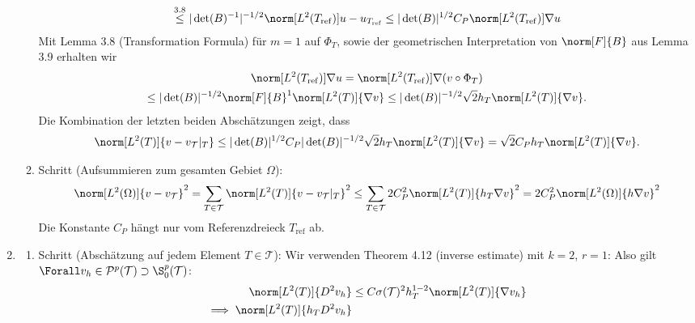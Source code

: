 \begin{solution}
\begin{enumerate}[label = \textbf{\alph*)}]
\begin{enumerate}[label = \arabic*.]
\begin{multline*}
      \stackrel
      {
        \mathrm{3.8}
      }{\leq}
      |\det(B)^{-1}|^{-1/2}
      \norm[L^2(T_\mathrm{ref})]{u - u_{T_\mathrm{ref}}}
      \leq
      |\det(B)|^{1/2}
      C_P
      \norm[L^2(T_\mathrm{ref})]{\nabla u}
    \end{multline*}
    Mit Lemma 3.8 (Transformation Formula) für $m = 1$ auf $\Phi_T$, sowie der
    geometrischen Interpretation von $\norm[F]{B}$ aus Lemma 3.9 erhalten wir
    \begin{multline*}
      \norm[L^2(T_\mathrm{ref})]{\nabla u}
      =
      \norm[L^2(T_\mathrm{ref})]{\nabla(v \circ \Phi_T)} \\
      \leq
      |\det(B)|^{-1/2}
      \norm[F]{B}^1
      \norm[L^2(T)]{\nabla v}
      \leq
      |\det(B)|^{-1/2}
      \sqrt{2}
      h_T
      \norm[L^2(T)]{\nabla v}.
    \end{multline*}
    Die Kombination der letzten beiden Abschätzungen zeigt, dass
    \begin{align*}
      \norm[L^2(T)]{v - v_\mathcal{T}|_T}
      \leq
      |\det(B)|^{1/2} C_P |\det(B)|^{-1/2} \sqrt{2} h_T \norm[L^2(T)]{\nabla v}
      =
      \sqrt{2} C_P h_T \norm[L^2(T)]{\nabla v}.
    \end{align*}
    \item Schritt (Aufsummieren zum gesamten Gebiet $\Omega$):
    \begin{align*}
      \norm[L^2(\Omega)]{v - v_\mathcal{T}}^2
      =
      \sum_{T \in \mathcal{T}}
      \norm[L^2(T)]{v - v_\mathcal{T}|_T}^2
      \leq
      \sum_{T \in \mathcal{T}}
      2 C_P^2 \norm[L^2(T)]{h_T \nabla v}^2
      =
      2 C_P^2 \norm[L^2(\Omega)]{h \nabla v}^2
    \end{align*}
    Die Konstante $C_P$ hängt nur vom Referenzdreieck $T_\mathrm{ref}$ ab.
  \end{enumerate}
  \item
  \begin{enumerate}[label = \arabic*.]
    \item Schritt (Abschätzung auf jedem Element $T \in \mathcal{T}$):
    Wir verwenden Theorem 4.12 (inverse estimate) mit $k = 2$, $r = 1$:
    Also gilt $\Forall v_h \in \mathcal{P}^p(\mathcal{T}) \supset \S_0^p(\mathcal{T})$:
    \begin{align*}
      \norm[L^2(T)]{D^2 v_h}
      & \leq
      C \sigma(\mathcal{T})^2 h_T^{1-2} \norm[L^2(T)]{\nabla v_h} \\
      \implies
      \norm[L^2(T)]{h_T D^2 v_h}

\end{align*}
\end{enumerate}
\end{enumerate}
\end{solution}
